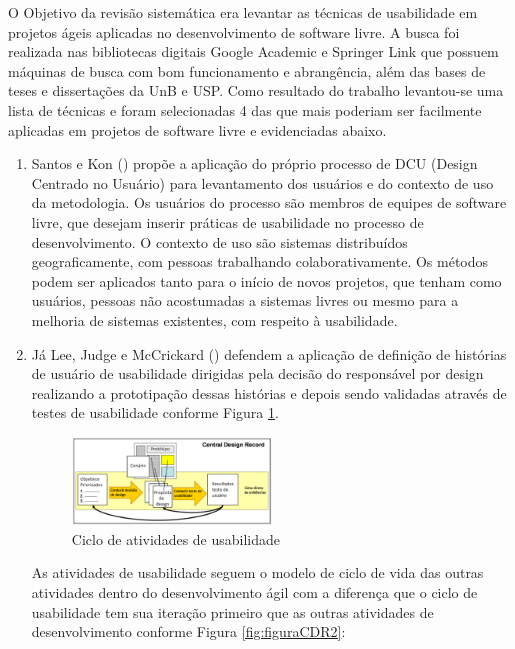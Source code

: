 O Objetivo da revisão sistemática era levantar as técnicas de usabilidade em projetos ágeis aplicadas no desenvolvimento de software livre. A busca foi realizada nas bibliotecas digitais Google Academic e Springer Link que possuem máquinas de busca com bom funcionamento e abrangência, além das bases de teses e dissertações da UnB e USP. Como resultado do trabalho levantou-se uma lista de técnicas e foram selecionadas 4 das que mais poderiam ser facilmente aplicadas em projetos de software livre e evidenciadas abaixo.

\begin{enumerate}
%
\item Santos e Kon (\citeyear{santoskon2009}) propõe a aplicação do próprio processo de DCU (Design Centrado no Usuário) para levantamento dos usuários e do contexto de uso da metodologia. Os usuários do processo são membros de equipes de software livre, que desejam inserir práticas de usabilidade no processo de desenvolvimento. O contexto de uso são sistemas distribuídos geograficamente, com pessoas trabalhando colaborativamente. Os métodos podem ser aplicados tanto para o início de novos projetos, que tenham como usuários, pessoas não acostumadas a sistemas livres ou mesmo para a melhoria de sistemas existentes, com respeito à usabilidade.

%
\item Já Lee, Judge e McCrickard (\citeyear{lee2011}) defendem a aplicação de definição de histórias de usuário de usabilidade dirigidas pela decisão do responsável por design realizando a prototipação dessas histórias e depois sendo validadas através de testes de usabilidade conforme Figura \ref{fig:figuraCDR}.

\begin{figure}[H]
  \begin{center}
    \includegraphics[width=0.5\textwidth]{figuras/figuraCDRBR.eps}
    \caption{Ciclo de atividades de usabilidade}
    \label{fig:figuraCDR}
  \end{center}
\end{figure}

%
As atividades de usabilidade seguem o modelo de ciclo de vida das outras atividades dentro do desenvolvimento ágil com a diferença que o ciclo de usabilidade tem sua iteração primeiro que as outras atividades de desenvolvimento conforme Figura \ref{fig:figuraCDR2}:


\end{enumerate}
